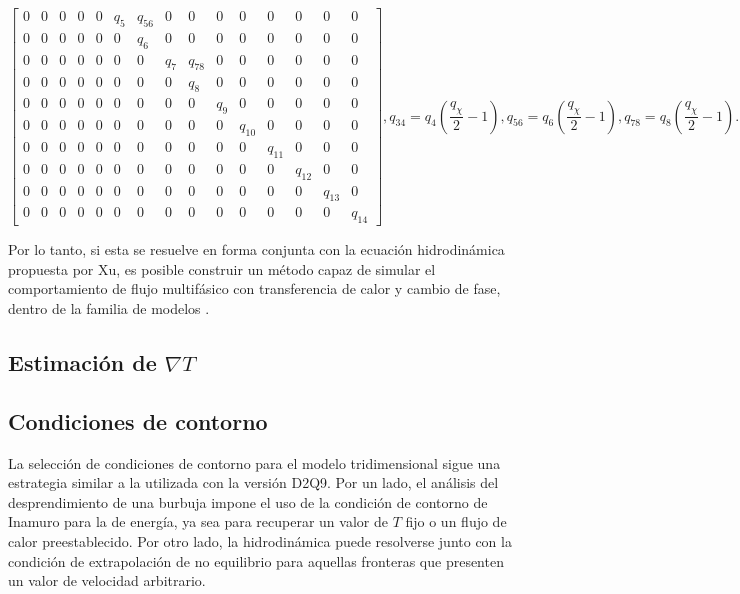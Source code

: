 \begin{subequations}
\begin{equation}
\begin{bmatrix}
		0 & 0 & 0 & 0 & 0 & q_5 & q_{56} & 0 & 0 & 0 & 0 & 0 & 0 & 0 & 0 \\
		0 & 0 & 0 & 0 & 0 & 0 & q_6 & 0 & 0 & 0 & 0 & 0 & 0 & 0 & 0 \\
		0 & 0 & 0 & 0 & 0 & 0 & 0 & q_7 & q_{78} & 0 & 0 & 0 & 0 & 0 & 0 \\
		0 & 0 & 0 & 0 & 0 & 0 & 0 & 0 & q_8 & 0 & 0 & 0 & 0 & 0 & 0 \\
		0 & 0 & 0 & 0 & 0 & 0 & 0 & 0 & 0 & q_{9} & 0 & 0 & 0 & 0 & 0 \\
		0 & 0 & 0 & 0 & 0 & 0 & 0 & 0 & 0 & 0 & q_{10} & 0 & 0 & 0 & 0 \\
		0 & 0 & 0 & 0 & 0 & 0 & 0 & 0 & 0 & 0 & 0 & q_{11} & 0 & 0 & 0 \\
		0 & 0 & 0 & 0 & 0 & 0 & 0 & 0 & 0 & 0 & 0 & 0 & q_{12} & 0 & 0 \\
		0 & 0 & 0 & 0 & 0 & 0 & 0 & 0 & 0 & 0 & 0 & 0 & 0 & q_{13} & 0 \\
		0 & 0 & 0 & 0 & 0 & 0 & 0 & 0 & 0 & 0 & 0 & 0 & 0 & 0 & q_{14}
		\end{bmatrix},	
	\end{equation}
	\begin{equation}
		q_{34} = q_4 \left( \dfrac{q_{\chi}}{2} - 1 \right),
	\end{equation}
	\begin{equation}
		q_{56} = q_6 \left( \dfrac{q_{\chi}}{2} - 1 \right),
	\end{equation}
	\begin{equation}
		q_{78} = q_8 \left( \dfrac{q_{\chi}}{2} - 1 \right).
	\end{equation}	
	\label{eq:modelo_3d_full}
\end{subequations}

Por lo tanto, si esta \lbe{} se resuelve en forma conjunta con la ecuaci\'on hidrodin\'amica propuesta por Xu, es posible construir un m\'etodo capaz de simular el comportamiento de flujo multif\'asico con transferencia de calor y cambio de fase, dentro de la familia de modelos \pp{}.

\subsection{Estimaci\'on de $\nabla T$}

\subsection{Condiciones de contorno}

La selecci\'on de condiciones de contorno para el modelo tridimensional sigue una estrategia similar a la utilizada con la versi\'on D2Q9. Por un lado, el an\'alisis del desprendimiento de una burbuja impone el uso de la condici\'on de contorno de Inamuro \cite{inamuro_lattice_2002} para la \lbe{} de energ\'ia, ya sea para recuperar un valor de $T$ fijo o un flujo de calor preestablecido. Por otro lado, la \lbe{} hidrodin\'amica puede resolverse junto con la condici\'on de extrapolaci\'on de no equilibrio para aquellas fronteras que presenten un valor de velocidad arbitrario.

